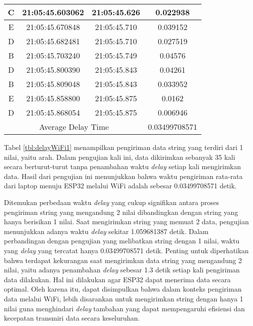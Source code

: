 \begin{longtable}{|ccc|c|}
    \multicolumn{1}{|c|}{C}    & \multicolumn{1}{c|}{21:05:45.603062} & 21:05:45.626       & 0.022938      \\ \hline
    \multicolumn{1}{|c|}{E}    & \multicolumn{1}{c|}{21:05:45.670848} & 21:05:45.710       & 0.039152      \\ \hline
    \multicolumn{1}{|c|}{D}    & \multicolumn{1}{c|}{21:05:45.682481} & 21:05:45.710       & 0.027519      \\ \hline
    \multicolumn{1}{|c|}{B}    & \multicolumn{1}{c|}{21:05:45.703240} & 21:05:45.749       & 0.04576       \\ \hline
    \multicolumn{1}{|c|}{D}    & \multicolumn{1}{c|}{21:05:45.800390} & 21:05:45.843       & 0.04261       \\ \hline
    \multicolumn{1}{|c|}{B}    & \multicolumn{1}{c|}{21:05:45.809048} & 21:05:45.843       & 0.033952      \\ \hline
    \multicolumn{1}{|c|}{E}    & \multicolumn{1}{c|}{21:05:45.858800} & 21:05:45.875       & 0.0162        \\ \hline
    \multicolumn{1}{|c|}{D}    & \multicolumn{1}{c|}{21:05:45.868054} & 21:05:45.875       & 0.006946      \\ \hline
    \multicolumn{3}{|c|}{Average Delay Time}                                               & 0.03499708571 \\ \hline
\end{longtable}

Tabel \ref{tbl:delayWiFi1} menampilkan pengiriman data string yang terdiri dari 1 nilai, yaitu arah. Dalam pengujian kali ini, data dikirimkan sebanyak 35 kali secara berturut-turut tanpa penambahan waktu \emph{delay} setiap kali mengirimkan data. Hasil dari pengujian ini menunjukkan bahwa waktu pengiriman rata-rata dari laptop menuju ESP32 melalui WiFi adalah sebesar 0.03499708571 detik.

Ditemukan perbedaan waktu \emph{delay} yang cukup signifikan antara proses pengiriman string yang mengandung 2 nilai dibandingkan dengan string yang hanya berisikan 1 nilai. Saat mengirimkan string yang memuat 2 data, pengujian menunjukkan adanya waktu \emph{delay} sekitar 1.059681387 detik. Dalam perbandingan dengan pengujian yang melibatkan string dengan 1 nilai, waktu yang \emph{delay} yang tercatat hanya 0.03499708571 detik. Penting untuk diperhatikan bahwa terdapat kekurangan saat mengirimkan data string yang mengandung 2 nilai, yaitu adanya penambahan \emph{delay} sebesar 1.3 detik setiap kali pengiriman data dilakukan. Hal ini dilakukan agar ESP32 dapat menerima data secara optimal. Oleh karena itu, dapat disimpulkan bahwa dalam konteks pengiriman data melalui WiFi, lebih disarankan untuk mengirimkan string dengan hanya 1 nilai guna menghindari \emph{delay} tambahan yang dapat mempengaruhi efisiensi dan kecepatan transmiri data secara keseluruhan.

